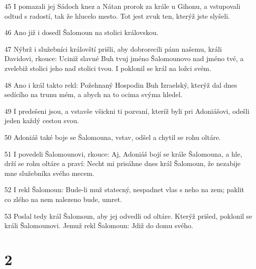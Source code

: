 \par 45 I pomazali jej Sádoch knez a Nátan prorok za krále u Gihonu, a vstupovali odtud s radostí, tak že hlucelo mesto. Tot jest zvuk ten, kterýž jste slyšeli.
\par 46 Ano již i dosedl Šalomoun na stolici královskou.
\par 47 Nýbrž i služebníci královští prišli, aby dobrorecili pánu našemu, králi Davidovi, rkouce: Uciniž slavné Buh tvuj jméno Šalomounovo nad jméno tvé, a zvelebiž stolici jeho nad stolici tvou. I poklonil se král na ložci svém.
\par 48 Ano i král takto rekl: Požehnaný Hospodin Buh Izraelský, kterýž dal dnes sedícího na trunu mém, a abych na to ocima svýma hledel.
\par 49 I predešeni jsou, a vstavše všickni ti pozvaní, kteríž byli pri Adoniášovi, odešli jeden každý cestou svou.
\par 50 Adoniáš také boje se Šalomouna, vstav, odšel a chytil se rohu oltáre.
\par 51 I povedeli Šalomounovi, rkouce: Aj, Adoniáš bojí se krále Šalomouna, a hle, drží se rohu oltáre a praví: Necht mi prisáhne dnes král Šalomoun, že nezabije mne služebníka svého mecem.
\par 52 I rekl Šalomoun: Bude-li muž statecný, nespadnet vlas s neho na zem; paklit co zlého na nem nalezeno bude, umret.
\par 53 Poslal tedy král Šalomoun, aby jej odvedli od oltáre. Kterýž prišed, poklonil se králi Šalomounovi. Jemuž rekl Šalomoun: Jdiž do domu svého.

\chapter{2}

